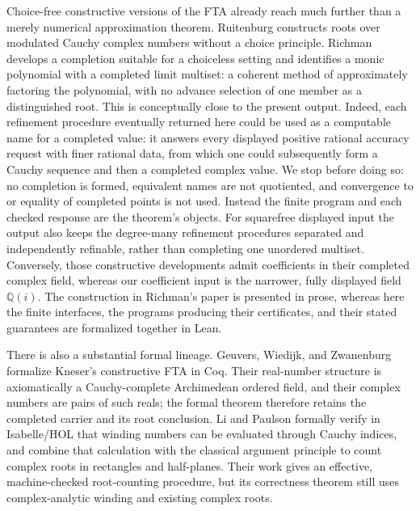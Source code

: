 \documentclass[11pt]{article}
\newcommand{\Qi}{\mathbb{Q}(i)}
\begin{document}
Choice-free constructive versions of the FTA already reach much further than
a merely numerical approximation theorem.  Ruitenburg \cite{Ruitenburg}
constructs roots over modulated Cauchy complex numbers without a choice
principle.  Richman \cite{Richman} develops a completion suitable for a
choiceless setting and identifies a monic polynomial with a completed limit
multiset: a coherent method of approximately factoring the polynomial, with
no advance selection of one member as a distinguished root.  This is
conceptually close to the present output.  Indeed, each refinement procedure
eventually returned here could be used as a computable name for a completed
value: it answers every displayed positive rational accuracy request with
finer rational data, from which one could subsequently form a Cauchy sequence
and then a completed complex value.  We stop before doing so: no completion is
formed, equivalent names are not quotiented, and convergence to or equality
of completed points is not used.  Instead the finite program and each checked
response are the theorem's objects.  For squarefree displayed input the
output also keeps the degree-many refinement procedures separated and
independently refinable, rather than completing one unordered multiset.
Conversely, those
constructive developments admit coefficients in their completed complex
field, whereas our coefficient input is the narrower, fully displayed field
$\Qi$.  The construction in Richman's paper is presented in prose, whereas
here the finite interfaces, the programs producing their certificates, and
their stated guarantees are formalized together in Lean.

There is also a substantial formal lineage.  Geuvers, Wiedijk, and
Zwanenburg \cite{GeuversWiedijkZwanenburg} formalize Kneser's constructive
FTA in Coq.  Their real-number structure is axiomatically a Cauchy-complete
Archimedean ordered field, and their complex numbers are pairs of such reals;
the formal theorem therefore retains the completed carrier and its root
conclusion.  Li and Paulson \cite{LiPaulson} formally verify in Isabelle/HOL
that winding numbers can be evaluated through Cauchy indices, and combine
that calculation with the classical argument principle to count complex
roots in rectangles and half-planes.  Their work gives an effective,
machine-checked root-counting procedure, but its correctness theorem still
uses complex-analytic winding and existing complex roots.
\end{document}
